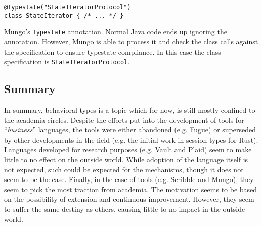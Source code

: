 \begin{listing}
    \centering
    \begin{verbatim}
@Typestate("StateIteratorProtocol")
class StateIterator { /* ... */ }
    \end{verbatim}
    \caption{
        Mungo's \texttt{Typestate} annotation. Normal Java code ends up ignoring the annotation.
        However, Mungo is able to process it and check the class calls against the specification to ensure typestate compliance.
        In this case the class specification is \texttt{StateIteratorProtocol}.
    }
    \label{lst:java-mungo-typestate}
\end{listing}

\subsection{Summary}

In summary, behavioral types is a topic which for now, is still mostly confined to the academia circles.
Despite the efforts put into the development of tools for “\emph{business}” languages,
the tools were either abandoned (e.g. Fugue) or
superseded by other developments in the field (e.g. the initial work in session types for Rust).
Languages developed for research purposes (e.g. Vault and Plaid) seem to make little to no effect on the outside world.
While adoption of the language itself is not expected, such could be expected for the mechanisms,
though it does not seem to be the case.
Finally, in the case of tools (e.g. Scribble and Mungo), they seem to pick the most traction from academia.
The motivation seems to be based on the possibility of extension and continuous improvement.
However, they seem to suffer the same destiny as others, causing little to no impact in the outside world.